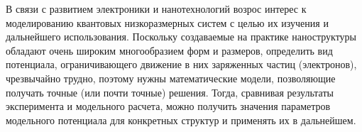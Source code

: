 





\date{15/XI/2012} %







\maketitle






    В связи с развитием электроники и нанотехнологий возрос интерес к моделированию квантовых низкоразмерных систем с целью их изучения и дальнейшего использования. Поскольку создаваемые на практике наноструктуры обладают очень широким многообразием форм и размеров, определить вид потенциала, ограничивающего движение в них заряженных частиц (электронов), чрезвычайно трудно, поэтому нужны математические модели, позволяющие получать точные (или почти точные) решения. Тогда, сравнивая результаты эксперимента и модельного расчета, можно получить значения параметров модельного потенциала  для конкретных структур и применять их в дальнейшем.



